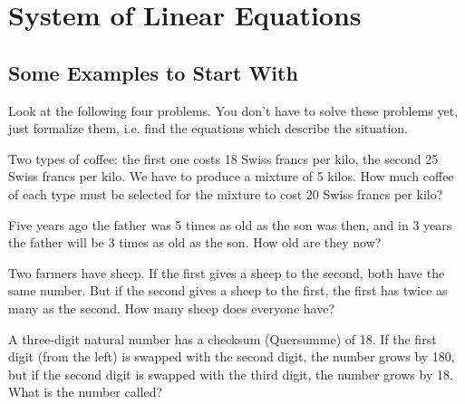 \newpage

\section{System of Linear Equations}


\subsection{Some Examples to Start With}

\label{Einleitungsbeispiele}
Look at the following four problems. You don't have to solve these problems yet, just formalize them, i.e. find the 
equations which describe the situation. 


\begin{exer}\label{exer1}
Two types of coffee: the first one costs 18 Swiss francs per kilo, the second 25 Swiss francs per kilo. We have to produce a mixture of 5 kilos. How much coffee of each type must be selected for the mixture to cost 20 Swiss francs per kilo?
\end{exer}
\vspace{5\baselineskip}

\begin{exer}\label{exer2}
Five years ago the father was 5 times as old as the son was then, and in 3 years the father will be 3 times as old as the son. How old are they now?
\end{exer}
\vspace{5\baselineskip}

\begin{exer}\label{exer3}
Two farmers have sheep. If the first gives a sheep to the second, both have the same number. But if the second gives a sheep to the first, the first has twice as many as the second. How many sheep does everyone have?
\end{exer}
\vspace{5\baselineskip}

\begin{exer}\label{exer4}
A three-digit natural number has a checksum (Quersumme) of 18. If the first digit (from the left) is swapped with the second digit, the number grows by 180, but if the second digit is swapped with the third digit, the number grows by 18. What is the number called?
\end{exer}
\vspace{5\baselineskip}
\newpage

